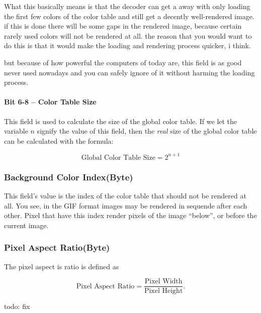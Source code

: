   What this basically means is that the decoder can get a away with
  only loading the first few colors of the color table and still get a
  decently well-rendered image. if this is done there will be some
  gaps in the rendered image, because certain rarely used colors will
  not be rendered at all. the reason that you would want to do this is
  that it would make the loading and rendering process quicker, i
  think.

  but because of how powerful the computers of today are, this field
  is as good never used nowadays and you can safely ignore of it
  without harming the loading process.

  \paragraph{Bit 6-8 -- Color Table Size}

  This field is used to calculate the size of the global color
  table. If we let the variable $n$ signify the value of this field,
  then the \textit{real} size of the global color table can be
  calculated with the formula:

  \begin{equation}
    \label{eq:calc-global-color-table-size}
    \textrm{Global Color Table Size} = 2^{n + 1}
  \end{equation}

  \subsubsection{Background Color Index(Byte)}

  This field's value is the index of the color table that should not
  be rendered at all. You see, in the GIF format images may be
  rendered in sequende after each other. Pixel that have this index
  render pixels of the image ``below'', or before the current image.


  \subsubsection{Pixel Aspect Ratio(Byte)}

  The pixel aspect is ratio is defined as

  \begin{equation*}
    \textrm{Pixel Aspect Ratio} = \frac{\text{Pixel Width}}{\text{Pixel Height}}.
  \end{equation*}

  todo: fix

